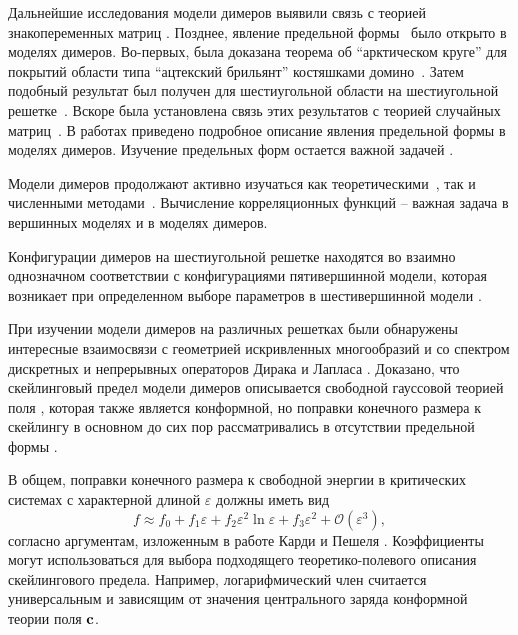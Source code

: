 \documentclass{article}
\begin{document}
Дальнейшие исследования модели димеров выявили связь с теорией знакопеременных матриц
\cite{elkies1992alternating1,elkies1992alternating2}. Позднее, явление предельной
формы~\cite{vershik1977kerov} было открыто в моделях димеров. Во-первых, была доказана теорема об
``арктическом круге'' для покрытий области типа ``ацтекский брильянт'' костяшками
домино~\cite{1998math......1068J}. Затем подобный результат был получен для шестиугольной области на
шестиугольной решетке~\cite{cohn1998shape}. Вскоре была установлена связь этих результатов с
теорией случайных матриц~\cite{johansson2002non}. В работах
\cite{kenyon2006dimers,kenyon2009lectures} приведено подробное описание явления предельной формы в
моделях димеров. Изучение предельных форм остается важной задачей \cite{borodin2010q,di2018tangent}. 

Модели димеров продолжают активно изучаться как теоретическими~\cite{zj2000,ferrari}, так и
численными методами~\cite{ks2018}. Вычисление корреляционных функций -- важная задача в вершинных
моделях  \cite{colomo2012approach} и в моделях димеров.

Конфигурации димеров на шестиугольной решетке находятся во взаимно однозначном соответствии с
конфигурациями пятивершинной модели, которая возникает при определенном выборе параметров в
шестивершинной модели \cite{kapitonov2012weighted,kapitonov2008five}.

При изучении модели димеров на различных решетках были обнаружены интересные взаимосвязи с
геометрией искривленных многообразий и со спектром дискретных и непрерывных операторов Дирака и
Лапласа \cite{kenyon2002laplacian,kenyon2000asymptotic}. Доказано, что скейлинговый предел модели
димеров описывается свободной гауссовой теорией поля \cite{kenyon2001dominos}, которая также
является конформной, но поправки конечного размера к скейлингу в основном до сих пор рассматривались
в отсутствии предельной формы
\cite{Sh_Izmailian_2019,izmailian2016finite,izmailian2011dimer,izmailian2007non,izmailian2005logarithmic}.

В общем, поправки конечного размера к свободной энергии в критических системах с характерной длиной
$\varepsilon$ должны иметь вид
\begin{equation*}
  f\approx f_{0}+f_{1}\varepsilon +f_{2}\varepsilon^{2}\ln\varepsilon+ f_{3}\varepsilon^{2}+\mathcal{O}(\varepsilon^{3}),
\end{equation*}
согласно аргументам, изложенным в работе Карди и Пешеля \cite{cardy1988finite}. Коэффициенты могут
использоваться для выбора подходящего теоретико-полевого описания скейлингового предела. Например,
логарифмический член считается универсальным и зависящим от значения центрального заряда конформной
теории поля ${\bf c}$. 
\end{document}
